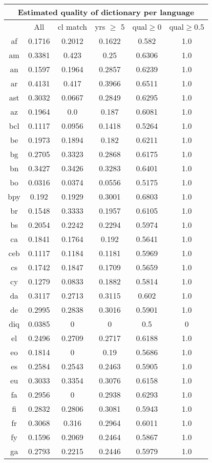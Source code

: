 \begin{figure}[h]
\centering
\begin{tabular}{cccccc}
\multicolumn{6}{c}{Estimated quality of dictionary per language}\\
\hline\hline
&All&cl match&yrs $\geq$ 5&qual$\geq$0&qual$\geq$0.5\\
\hline\hline
af&0.1716&0.2012&0.1622&0.582&1.0\\
am&0.3381&0.423&0.25&0.6306&1.0\\
an&0.1597&0.1964&0.2857&0.6239&1.0\\
ar&0.4131&0.417&0.3966&0.6511&1.0\\
ast&0.3032&0.0667&0.2849&0.6295&1.0\\
az&0.1964&0.0&0.187&0.6081&1.0\\
bcl&0.1117&0.0956&0.1418&0.5264&1.0\\
be&0.1973&0.1894&0.182&0.6211&1.0\\
bg&0.2705&0.3323&0.2868&0.6175&1.0\\
bn&0.3427&0.3426&0.3283&0.6401&1.0\\
bo&0.0316&0.0374&0.0556&0.5175&1.0\\
bpy&0.192&0.1929&0.3001&0.6803&1.0\\
br&0.1548&0.3333&0.1957&0.6105&1.0\\
bs&0.2054&0.2242&0.2294&0.5974&1.0\\
ca&0.1841&0.1764&0.192&0.5641&1.0\\
ceb&0.1117&0.1184&0.1181&0.5969&1.0\\
cs&0.1742&0.1847&0.1709&0.5659&1.0\\
cy&0.1279&0.0833&0.1882&0.5814&1.0\\
da&0.3117&0.2713&0.3115&0.602&1.0\\
de&0.2995&0.2838&0.3016&0.5901&1.0\\
diq&0.0385&0&0&0.5&0\\
el&0.2496&0.2709&0.2717&0.6188&1.0\\
eo&0.1814&0&0.19&0.5686&1.0\\
es&0.2584&0.2543&0.2463&0.5905&1.0\\
eu&0.3033&0.3354&0.3076&0.6158&1.0\\
fa&0.2956&0&0.2938&0.6293&1.0\\
fi&0.2832&0.2806&0.3081&0.5943&1.0\\
fr&0.3068&0.316&0.2964&0.6011&1.0\\
fy&0.1596&0.2069&0.2464&0.5867&1.0\\
ga&0.2793&0.2215&0.2446&0.5979&1.0\\

\end{tabular}
\end{figure}
